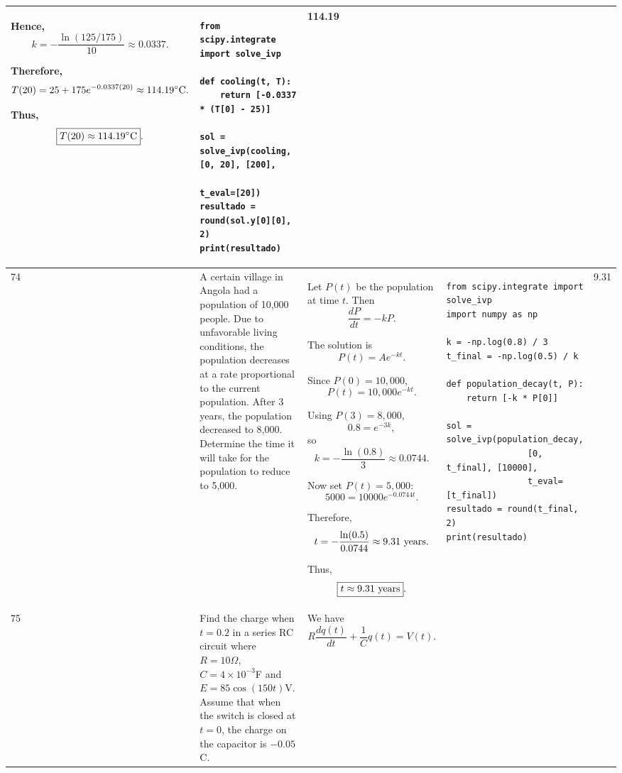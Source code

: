 \documentclass[a4paper,12pt]{article}
\begin{document}
\begin{longtable}{|p{0.3cm}|p{}|p{10cm}|p{}|p{1.5cm}|}
Hence,
\[
k=-\frac{\ln(125/175)}{10}
\approx0.0337.
\]

Therefore,
\[
T(20)=25+175e^{-0.0337(20)}
\approx114.19^\circ{\rm C}.
\]

Thus,
\[
\boxed{T(20)\approx114.19^\circ{\rm C}}.
\]
&
\begin{verbatim}
from scipy.integrate import solve_ivp

def cooling(t, T):
    return [-0.0337 * (T[0] - 25)]

sol = solve_ivp(cooling, [0, 20], [200],
                t_eval=[20])
resultado = round(sol.y[0][0], 2)
print(resultado)
\end{verbatim}
&
114.19 \\
\hline

74 &
A certain village in Angola had a population of 10,000 people. Due to unfavorable living conditions, the population decreases at a rate proportional to the current population. After 3 years, the population decreased to 8,000. Determine the time it will take for the population to reduce to 5,000. &
Let $P(t)$ be the population at time $t$. Then
\[
\frac{dP}{dt}=-kP.
\]

The solution is
\[
P(t)=Ae^{-kt}.
\]

Since $P(0)=10,000$,
\[
P(t)=10,000e^{-kt}.
\]

Using $P(3)=8,000$,
\[
0.8=e^{-3k},
\]
so
\[
k=-\frac{\ln(0.8)}{3}
\approx0.0744.
\]

Now set $P(t)=5,000$:
\[
5000=10000e^{-0.0744t}.
\]

Therefore,
\[
t=-\frac{\ln(0.5)}{0.0744}
\approx9.31\ {\rm years}.
\]

Thus,
\[
\boxed{t\approx9.31\ {\rm years}}.
\]
&
\begin{verbatim}
from scipy.integrate import solve_ivp
import numpy as np

k = -np.log(0.8) / 3
t_final = -np.log(0.5) / k

def population_decay(t, P):
    return [-k * P[0]]

sol = solve_ivp(population_decay,
                [0, t_final], [10000],
                t_eval=[t_final])
resultado = round(t_final, 2)
print(resultado)
\end{verbatim}
&
9.31 \\
\hline

75 &
Find the charge when $t=0.2$ in a series RC circuit where $R=10\Omega$, $C=4\times10^{-3}$F and $E=85\cos(150t)$V. Assume that when the switch is closed at $t=0$, the charge on the capacitor is $-0.05$C. &
We have
\[
R\frac{dq(t)}{dt}+\frac{1}{C}q(t)=V(t).
\]


\end{longtable}
\end{document}
